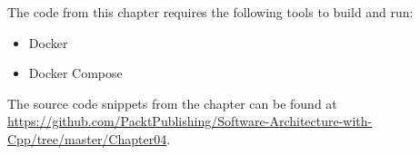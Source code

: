 
The code from this chapter requires the following tools to build and run:

\begin{itemize}
\item Docker
\item Docker Compose

\end{itemize}

The source code snippets from the chapter can be found at \url{https://github.com/PacktPublishing/Software-Architecture-with-Cpp/tree/master/Chapter04}.